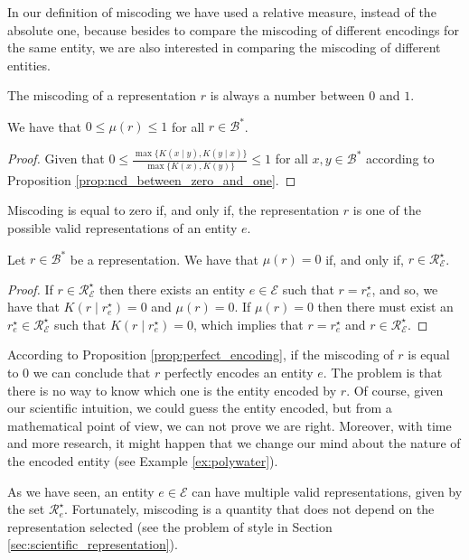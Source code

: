 In our definition of miscoding we have used a relative measure, instead of the absolute one, because besides to compare the miscoding of different encodings for the same entity, we are also interested in comparing the miscoding of different entities.

The miscoding of a representation $r$ is always a number between $0$ and $1$.

\begin{proposition}
\label{prop:range_miscoding}
We have that $0 \leq \mu(r) \leq 1$ for all $r \in \mathcal{B}^\ast$.
\end{proposition}
\begin{proof}
Given that $0 \leq \frac{ \max\{ K(x \mid y), K(y \mid x) \} } { \max\{ K(x), K(y) \} } \leq 1$ for all $x, y \in \mathcal{B}^\ast$ according to Proposition \ref{prop:ncd_between_zero_and_one}.
\end{proof}

Miscoding is equal to zero if, and only if, the representation $r$ is one of the possible valid representations of an entity $e$.

\begin{proposition}\label{prop:perfect_encoding}
Let $r \in \mathcal{B}^\ast$ be a representation. We have that $\mu(r) = 0$ if, and only if, $r \in \mathcal{R}^\star_\mathcal{E}$.
\end{proposition}
\begin{proof}
If $r \in \mathcal{R}^\star_\mathcal{E}$ then there exists an entity $e \in \mathcal{E}$ such that $r = r^\star_e$, and so, we have that $K \left( r \mid r^\star_e \right) = 0$ and $\mu(r) = 0$. If $\mu(r) = 0$ then there must exist an $r^\star_e \in \mathcal{R}^\star_\mathcal{E}$ such that $K \left( r \mid r^\star_e \right) = 0$, which implies that $r = r^\star_e$ and $r \in \mathcal{R}^\star_\mathcal{E}$.
\end{proof}

According to Proposition \ref{prop:perfect_encoding}, if the miscoding of $r$ is equal to 0 we can conclude that $r$ perfectly encodes an entity $e$. The problem is that there is no way to know which one is the entity encoded by $r$. Of course, given our scientific intuition, we could guess the entity encoded, but from a mathematical point of view, we can not prove we are right. Moreover, with time and more research, it might happen that we change our mind about the nature of the encoded entity (see Example \ref{ex:polywater}).

As we have seen, an entity $e \in \mathcal{E}$ can have multiple valid representations, given by the set $\mathcal{R}^\star_e$. Fortunately, miscoding is a quantity that does not depend on the representation selected (see the problem of style in Section \ref{sec:scientific_representation}).

